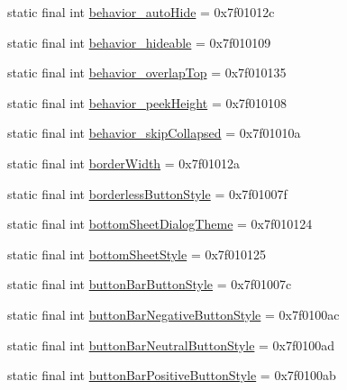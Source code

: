 \begin{CompactItemize}
static final int \hyperlink{classandroid_1_1support_1_1v7_1_1recyclerview_1_1_r_1_1attr_aeeaaa32399b4924c1e62cd8dbd91b45}{behavior\_\-autoHide} = 0x7f01012c
\item 
static final int \hyperlink{classandroid_1_1support_1_1v7_1_1recyclerview_1_1_r_1_1attr_f4682b534fcc0653dd3445cdfebbaea4}{behavior\_\-hideable} = 0x7f010109
\item 
static final int \hyperlink{classandroid_1_1support_1_1v7_1_1recyclerview_1_1_r_1_1attr_c15e9f2a106470cf4fda3fe16b7b9254}{behavior\_\-overlapTop} = 0x7f010135
\item 
static final int \hyperlink{classandroid_1_1support_1_1v7_1_1recyclerview_1_1_r_1_1attr_f775333afd6a4afad758a972cfdc82a3}{behavior\_\-peekHeight} = 0x7f010108
\item 
static final int \hyperlink{classandroid_1_1support_1_1v7_1_1recyclerview_1_1_r_1_1attr_23a6de30b72075d25050941ed875f566}{behavior\_\-skipCollapsed} = 0x7f01010a
\item 
static final int \hyperlink{classandroid_1_1support_1_1v7_1_1recyclerview_1_1_r_1_1attr_02f825c7e9695394904b27a93ab22916}{borderWidth} = 0x7f01012a
\item 
static final int \hyperlink{classandroid_1_1support_1_1v7_1_1recyclerview_1_1_r_1_1attr_19c349c57e1a5edb18a4b1999d06f0c3}{borderlessButtonStyle} = 0x7f01007f
\item 
static final int \hyperlink{classandroid_1_1support_1_1v7_1_1recyclerview_1_1_r_1_1attr_117c7dd2f5aac550d06c55f9e7c89ac1}{bottomSheetDialogTheme} = 0x7f010124
\item 
static final int \hyperlink{classandroid_1_1support_1_1v7_1_1recyclerview_1_1_r_1_1attr_dc801284dfaa426b8e30facccaf6262a}{bottomSheetStyle} = 0x7f010125
\item 
static final int \hyperlink{classandroid_1_1support_1_1v7_1_1recyclerview_1_1_r_1_1attr_79eb6a5d2ed2cdffcf4437a79a8221f5}{buttonBarButtonStyle} = 0x7f01007c
\item 
static final int \hyperlink{classandroid_1_1support_1_1v7_1_1recyclerview_1_1_r_1_1attr_bed05679368f00aff086f5c9f07469c9}{buttonBarNegativeButtonStyle} = 0x7f0100ac
\item 
static final int \hyperlink{classandroid_1_1support_1_1v7_1_1recyclerview_1_1_r_1_1attr_41998e73e5e03ce369b946edd75aba67}{buttonBarNeutralButtonStyle} = 0x7f0100ad
\item 
static final int \hyperlink{classandroid_1_1support_1_1v7_1_1recyclerview_1_1_r_1_1attr_12554fb692ffbaabc71070d05737df64}{buttonBarPositiveButtonStyle} = 0x7f0100ab

\end{CompactItemize}
